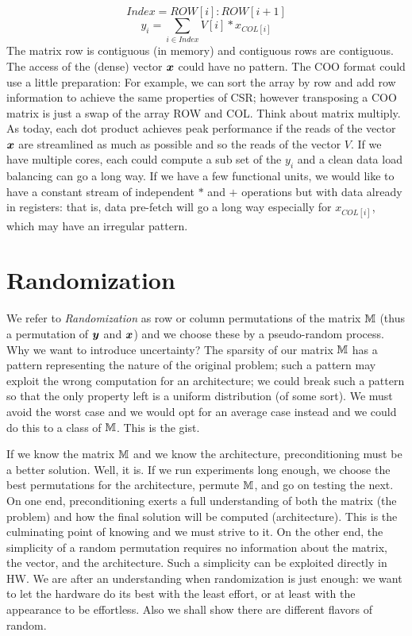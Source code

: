 \documentclass[manuscript,screen]{acmart}
\begin{document}
\[ Index = ROW[i]:ROW[i+1] \]
\[
y_i =  \sum_{i\in Index} V[i] * x_{COL[i]}  
\]
The matrix row is contiguous (in memory) and contiguous rows are
contiguous. The access of the (dense) vector ${\boldsymbol x}$ could have no
pattern. The COO format could use a little preparation: For example,
we can sort the array by row and add row information to achieve the
same properties of CSR; however transposing a COO matrix is just a
swap of the array ROW and COL. Think about matrix multiply. As today,
each dot product achieves peak performance if the reads of the vector
${\boldsymbol x}$ are streamlined as much as possible and so the reads of the
vector $V$. If we have multiple cores, each could compute a sub set of
the $y_i$ and a clean data load balancing can go a long way. If we
have a few functional units, we would like to have a constant stream
of independent $*$ and $+$ operations but with data already in
registers: that is, data pre-fetch will go a long way especially for
$x_{COL[i]}$, which may have an irregular pattern.


\section{Randomization}
\label{sec:randomization}
We refer to {\em Randomization} as row or column permutations of the
matrix $\mathbb{M}$ (thus a permutation of ${\boldsymbol y}$ and ${\boldsymbol x}$) and we choose
these by a pseudo-random process. Why we want to introduce
uncertainty? The sparsity of our matrix $\mathbb{M}$ has a pattern
representing the nature of the original problem; such a pattern may
exploit the wrong computation for an architecture; we could break such
a pattern so that the only property left is a uniform distribution (of
some sort). We must avoid the worst case and we would opt for an
average case instead and we could do this to a class of $\mathbb{M}$. This is
the gist.

If we know the matrix $\mathbb{M}$ and we know the architecture,
preconditioning must be a better solution.  Well, it is. If we run
experiments long enough, we choose the best permutations for the
architecture, permute $\mathbb{M}$, and go on testing the next.  On one end,
preconditioning exerts a full understanding of both the matrix (the
problem) and how the final solution will be computed
(architecture). This is the culminating point of knowing and we must
strive to it. On the other end, the simplicity of a random permutation
requires no information about the matrix, the vector, and the
architecture. Such a simplicity can be exploited directly in HW. We
are after an understanding when randomization is just enough: we want
to let the hardware do its best with the least effort, or at least
with the appearance to be effortless. Also we shall show there are
different flavors of random.
\end{document}
